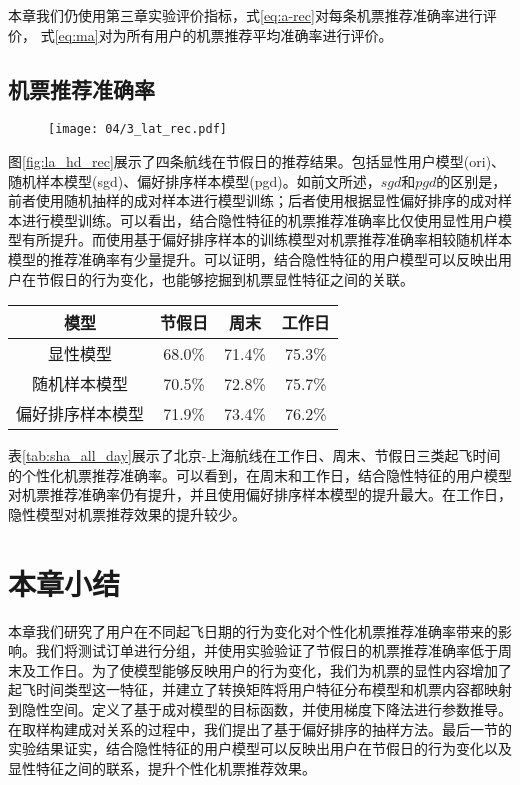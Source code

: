 本章我们仍使用第三章实验评价指标，式\ref{eq:a-rec}对每条机票推荐准确率进行评价，
式\ref{eq:ma}对为所有用户的机票推荐平均准确率进行评价。

\subsection{机票推荐准确率}

\begin{figure}
 \centering
 \texttt{[image: 04/3\_lat\_rec.pdf]}
\end{figure}

图\ref{fig:la_hd_rec}展示了四条航线在节假日的推荐结果。包括显性用户模型(ori)、随机样本模型(sgd)、偏好排序样本模型(pgd)。如前文所述，$sgd$和$pgd$的区别是，前者使用随机抽样的成对样本进行模型训练；后者使用根据显性偏好排序的成对样本进行模型训练。可以看出，结合隐性特征的机票推荐准确率比仅使用显性用户模型有所提升。而使用基于偏好排序样本的训练模型对机票推荐准确率相较随机样本模型的推荐准确率有少量提升。可以证明，结合隐性特征的用户模型可以反映出用户在节假日的行为变化，也能够挖掘到机票显性特征之间的关联。


\begin{table}[!hpb]
  \centering
  \begin{tabular}{|c|c|c|c|} \hline 
模型 & 节假日 & 周末 & 工作日 \\ \hline
显性模型 & 68.0\% & 71.4\% & 75.3\% \\ \hline
随机样本模型 & 70.5\% & 72.8\% & 75.7\% \\ \hline
偏好排序样本模型 & 71.9\% & 73.4\% & 76.2\% \\ \hline

  \end{tabular}
\end{table}

表\ref{tab:sha_all_day}展示了北京-上海航线在工作日、周末、节假日三类起飞时间的个性化机票推荐准确率。可以看到，在周末和工作日，结合隐性特征的用户模型对机票推荐准确率仍有提升，并且使用偏好排序样本模型的提升最大。在工作日，隐性模型对机票推荐效果的提升较少。


\section{本章小结}

本章我们研究了用户在不同起飞日期的行为变化对个性化机票推荐准确率带来的影响。我们将测试订单进行分组，并使用实验验证了节假日的机票推荐准确率低于周末及工作日。为了使模型能够反映用户的行为变化，我们为机票的显性内容增加了起飞时间类型这一特征，并建立了转换矩阵将用户特征分布模型和机票内容都映射到隐性空间。定义了基于成对模型的目标函数，并使用梯度下降法进行参数推导。在取样构建成对关系的过程中，我们提出了基于偏好排序的抽样方法。最后一节的实验结果证实，结合隐性特征的用户模型可以反映出用户在节假日的行为变化以及显性特征之间的联系，提升个性化机票推荐效果。








